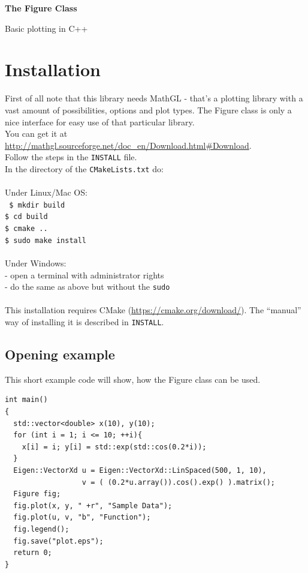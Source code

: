 \documentclass[a4paper]{article}
\begin{document}
\begin{center}
  \begin{huge}
    \textbf{The Figure Class\\}
  \end{huge}
  Basic plotting in C++
\end{center}
  
\vspace*{3cm}
  \tableofcontents
\vspace*{\fill}

\newpage
{}
\section{Installation}

First of all note that this library needs MathGL - that's a plotting library with a vast amount of possibilities, options and plot types.
The Figure class is only a nice interface for easy use of that particular library. \\
You can get it at \url{http://mathgl.sourceforge.net/doc_en/Download.html#Download}. \\

Follow the steps in the \texttt{INSTALL} file. \\
In the directory of the \texttt{CMakeLists.txt} do: \\ \\
Under Linux/Mac OS: \\
\texttt{
\indent   \$ mkdir build \\
\indent   \$ cd build \\
\indent   \$ cmake .. \\
\indent   \$ sudo make install \\ \\
}
Under Windows: \\
\indent    - open a terminal with administrator rights \\
\indent    - do the same as above but without the \texttt{sudo} \\ \\
%
This installation requires CMake (\url{https://cmake.org/download/}). 
The ``manual'' way of installing it is described in \texttt{INSTALL}.

\subsection{Opening example}

This short example code will show, how the Figure class can be used.
\begin{lstlisting}
int main()
{
  std::vector<double> x(10), y(10);
  for (int i = 1; i <= 10; ++i){ 
    x[i] = i; y[i] = std::exp(std::cos(0.2*i));
  }
  Eigen::VectorXd u = Eigen::VectorXd::LinSpaced(500, 1, 10),
                  v = ( (0.2*u.array()).cos().exp() ).matrix();
  Figure fig;
  fig.plot(x, y, " +r", "Sample Data");
  fig.plot(u, v, "b", "Function");
  fig.legend();
  fig.save("plot.eps");
  return 0;
}
\end{lstlisting}
\end{document}
